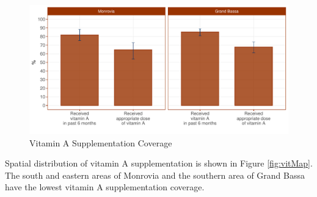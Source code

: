 \documentclass[12pt,a4paper]{article}
\begin{document}
\begin{figure}[H]

{\centering \includegraphics{liberiaCoverageReport_files/figure-latex/vit1-1} 

}

\caption{Vitamin A Supplementation Coverage}\label{fig:vit1}
\end{figure}

\begin{table}[H]

\caption{\label{tab:vit2}Vitamin A Supplementation Coverage}
\centering
{}
\end{table}

Spatial distribution of vitamin A supplementation is shown in Figure \ref{fig:vitMap}. The south and eastern areas of Monrovia and the southern area of Grand Bassa have the lowest vitamin A supplementation coverage.
\end{document}
